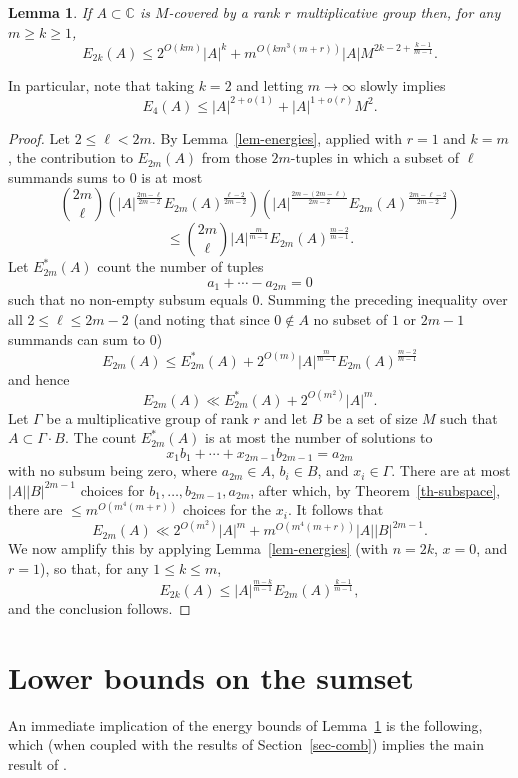 \documentclass{amsart}
\renewcommand{\leq}{\leqslant}
\renewcommand{\geq}{\geqslant}
\newcommand{\bbc}{\mathbb{C}}
\newcommand{\abs}[1]{\left\lvert #1\right\rvert}
\newcommand{\brac}[1]{\left( #1\right)}
\newtheorem{lemma}{Lemma}
\theoremstyle{definition}
\begin{document}
\begin{lemma}\label{lem-energy}
If $A\subset \bbc$ is $M$-covered by a rank $r$ multiplicative group then, for any $m\geq k\geq 1$,
\[E_{2k}(A)\leq 2^{O(km)}\abs{A}^{k}+m^{O(km^3(m+r))}\abs{A}M^{2k-2+\frac{k-1}{m-1}}.\]
\end{lemma}
In particular, note that taking $k=2$ and letting $m\to \infty$ slowly implies
\[E_4(A) \leq \abs{A}^{2+o(1)}+\abs{A}^{1+o(r)}M^2.\]
\begin{proof}
Let $2\leq \ell <2m$. By Lemma~\ref{lem-energies}, applied with $r=1$ and $k=m$, the contribution to $E_{2m}(A)$ from those $2m$-tuples in which a subset of $\ell$ summands sums to $0$ is at most
\[\binom{2m}{\ell}\brac{ \abs{A}^{\frac{2m-\ell}{2m-2}}E_{2m}(A)^{\frac{\ell-2}{2m-2}}}\brac{ \abs{A}^{\frac{2m-(2m-\ell)}{2m-2}}E_{2m}(A)^{\frac{2m-\ell-2}{2m-2}}}\]
\[\leq \binom{2m}{\ell}\abs{A}^{\frac{m}{m-1}}E_{2m}(A)^{\frac{m-2}{m-1}}.\]
Let $E_{2m}^*(A)$ count the number of tuples 
\[a_1+\cdots-a_{2m}=0\]
such that no non-empty subsum equals $0$. Summing the preceding inequality over all $2\leq \ell\leq 2m-2$ (and noting that since $0\not\in A$ no subset of $1$ or $2m-1$ summands can sum to $0$)
\[E_{2m}(A) \leq E_{2m}^*(A)+2^{O(m)}\abs{A}^{\frac{m}{m-1}}E_{2m}(A)^{\frac{m-2}{m-1}}\]
and hence
\[E_{2m}(A) \ll E_{2m}^*(A)+2^{O(m^2)}\abs{A}^m.\]
Let $\Gamma$ be a multiplicative group of rank $r$ and let $B$ be a set of size $M$ such that $A\subset\Gamma\cdot B$. The count $E_{2m}^*(A)$ is at most the number of solutions to
\[x_1b_1+\cdots+x_{2m-1}b_{2m-1}=a_{2m}\]
with no subsum being zero, where $a_{2m}\in A$, $b_i\in B$, and $x_i\in \Gamma$. There are at most $\abs{A}\abs{B}^{2m-1}$ choices for $b_1,\ldots,b_{2m-1},a_{2m}$, after which, by Theorem~\ref{th-subspace}, there are $\leq m^{O(m^4(m+r))}$ choices for the $x_i$. It follows that
\[E_{2m}(A) \ll 2^{O(m^2)}\abs{A}^m+ m^{O(m^4(m+r))}\abs{A}\abs{B}^{2m-1}.\]
We now amplify this by applying Lemma~\ref{lem-energies} (with $n=2k$, $x=0$, and $r=1$), so that, for any $1\leq k\leq m$,
\[E_{2k}(A)\leq \abs{A}^{\frac{m-k}{m-1}}E_{2m}(A)^{\frac{k-1}{m-1}},\]
and the conclusion follows.
\end{proof}


\section{Lower bounds on the sumset}\label{sec-add2}

An immediate implication of the energy bounds of Lemma~\ref{lem-energy} is the following, which (when coupled with the results of Section~\ref{sec-comb}) implies the main result of \cite{HRSZ25}.
\end{document}
